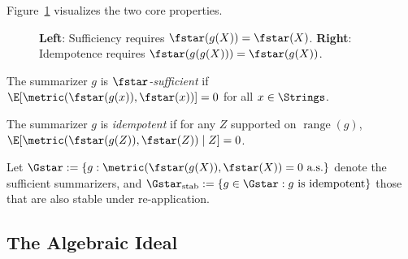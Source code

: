 Figure~\ref{fig:gstar} visualizes the two core properties.

\begin{figure}[t]
    \centering
    \caption{\textbf{Left}: Sufficiency requires $\fstar(g(X)) = \fstar(X)$. \textbf{Right}: Idempotence requires $\fstar(g(g(X))) = \fstar(g(X))$.}
    \label{fig:gstar}
\end{figure}

\begin{definition}\label{def:oracle-suff}
The summarizer $g$ is \emph{$\fstar$-sufficient} if $\E[\metric(\fstar(g(x)), \fstar(x))] = 0$ for all $x \in \Strings$.
\end{definition}

\begin{definition}\label{def:idempotence}
The summarizer $g$ is \emph{idempotent} if for any $Z$ supported on $\operatorname{range}(g)$, $\E[\metric(\fstar(g(Z)), \fstar(Z)) \mid Z] = 0$.
\end{definition}

\begin{definition}\label{def:gstar-classes}
Let $\Gstar := \{g : \metric(\fstar(g(X)), \fstar(X)) = 0 \text{ a.s.}\}$ denote the sufficient summarizers, and $\Gstar_{\mathrm{stab}} := \{g \in \Gstar : g \text{ is idempotent}\}$ those that are also stable under re-application.
\end{definition}

\subsection{The Algebraic Ideal}\label{sec:algebraic-ideal}


